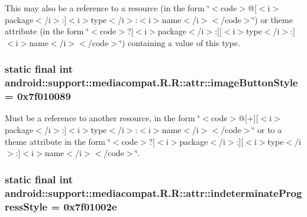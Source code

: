 This may also be a reference to a resource (in the form \char`\"{}$<$code$>$@\mbox{[}$<$i$>$package$<$/i$>$:\mbox{]}$<$i$>$type$<$/i$>$:$<$i$>$name$<$/i$>$$<$/code$>$\char`\"{}) or theme attribute (in the form \char`\"{}$<$code$>$?\mbox{[}$<$i$>$package$<$/i$>$:\mbox{]}\mbox{[}$<$i$>$type$<$/i$>$:\mbox{]}$<$i$>$name$<$/i$>$$<$/code$>$\char`\"{}) containing a value of this type. \hypertarget{classandroid_1_1support_1_1mediacompat_1_1_r_1_1attr_65500f3e5a0e5361c98528a36dcceb73}{
\subsubsection[{imageButtonStyle}]{\setlength{\rightskip}{0pt plus 5cm}static final int android::support::mediacompat.R.R::attr::imageButtonStyle = 0x7f010089}}
\label{classandroid_1_1support_1_1mediacompat_1_1_r_1_1attr_65500f3e5a0e5361c98528a36dcceb73}


Must be a reference to another resource, in the form \char`\"{}$<$code$>$@\mbox{[}+\mbox{]}\mbox{[}$<$i$>$package$<$/i$>$:\mbox{]}$<$i$>$type$<$/i$>$:$<$i$>$name$<$/i$>$$<$/code$>$\char`\"{} or to a theme attribute in the form \char`\"{}$<$code$>$?\mbox{[}$<$i$>$package$<$/i$>$:\mbox{]}\mbox{[}$<$i$>$type$<$/i$>$:\mbox{]}$<$i$>$name$<$/i$>$$<$/code$>$\char`\"{}. \hypertarget{classandroid_1_1support_1_1mediacompat_1_1_r_1_1attr_3b0e4bced3042c212cfe53219cd9d0c2}{
\subsubsection[{indeterminateProgressStyle}]{\setlength{\rightskip}{0pt plus 5cm}static final int android::support::mediacompat.R.R::attr::indeterminateProgressStyle = 0x7f01002e}}
\label{classandroid_1_1support_1_1mediacompat_1_1_r_1_1attr_3b0e4bced3042c212cfe53219cd9d0c2}


